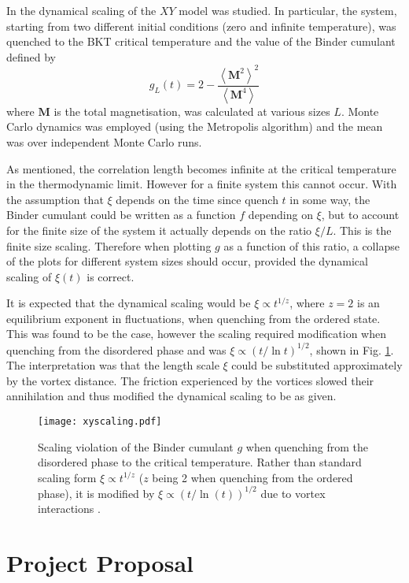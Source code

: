 \documentclass[letterpaper, 10 pt, conference]{IEEEtran}  %
\newcommand{\mean}[1]{\left < #1 \right >}
\newcommand{\myvec}[1]{\boldsymbol{#1}}
\newcommand{\fig}[1]{Fig. #1}
\begin{document}
In \cite{PhysRevLett.84.1503} the dynamical scaling of the $XY$ model was studied. 
In particular, the system, starting from two different initial conditions (zero and infinite temperature), was quenched to the BKT critical temperature and the value of the Binder cumulant defined by 
\[
	g_L(t) = 2 - \frac{\mean{\myvec{M}^2}^2}{\mean{\myvec{M}^4}}
\]
where $\myvec{M}$ is the total magnetisation, was calculated at various sizes $L$. 
Monte Carlo dynamics was employed (using the Metropolis algorithm) and the mean was over independent Monte Carlo runs.

As mentioned, the correlation length becomes infinite at the critical temperature in the thermodynamic limit. 
However for a finite system this cannot occur. 
With the assumption that $\xi$ depends on the time since quench $t$ in some way, the Binder cumulant could be written as a function $f$ depending on $\xi$, but to account for the finite size of the system it actually depends on the ratio $\xi/L$.
This is the finite size scaling. 
Therefore when plotting $g$ as a function of this ratio, a collapse of the plots for different system sizes should occur, provided the dynamical scaling of $\xi(t)$ is correct. 

It is expected that the dynamical scaling would be $\xi \propto t^{1/z}$, where $z=2$ is an equilibrium exponent in fluctuations, when quenching from the ordered state.
This was found to be the case, however the scaling required modification when quenching from the disordered phase and was $\xi \propto (t/\ln t)^{1/2}$, shown in \fig{\ref{fig:xyscaling}}.  
The interpretation was that the length scale $\xi$ could be substituted approximately by the vortex distance. 
The friction experienced by the vortices slowed their annihilation and thus modified the dynamical scaling to be as given.  

\begin{figure}[htbp!]
	\centering
	\texttt{[image: xyscaling.pdf]}
	\caption{Scaling violation of the Binder cumulant $g$ when quenching from the disordered phase to the critical temperature. 
	Rather than standard scaling form $\xi \propto t^{1/z}$ ($z$ being 2 when quenching from the ordered phase), it is modified by $\xi \propto (t/\ln(t))^{1/2}$ due to vortex interactions \cite{PhysRevLett.84.1503}.}
	\label{fig:xyscaling}
\end{figure}
	

\section{Project Proposal}
\end{document}
